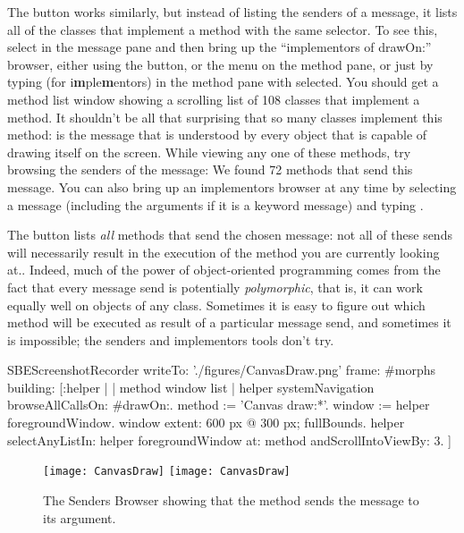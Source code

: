 \documentclass[a4paper,10pt,twoside]{book}
\begin{document}
The  button works similarly, but instead of listing the senders of a message, it lists all of the classes that implement a method with the same selector.
To see this, select  in the message pane and then bring up the ``implementors of drawOn:'' browser, either using the  button, or the  menu on the method pane, or just by typing  (for {i\textbf{m}ple\textbf{m}entors}) in the method pane with  selected.
You should get a method list window showing a scrolling list of 108 classes that implement a  method.
It shouldn't be all that surprising that so many classes implement this method:
 is the message that is understood by every object that is capable of drawing itself on the screen.
While viewing any one of these methods, try browsing the senders of the  message:
We found 72 methods that send this message.
You can also bring up an implementors browser at any time by selecting a message (including the arguments if it is a keyword message) and typing .

The  button lists \emph{all} methods that send the chosen message: not all of these sends will necessarily result in the execution of the method you are currently looking at..
Indeed, much of the power of object-oriented programming comes from the fact that every message send is potentially \emph{polymorphic}, that is, it can work equally well on objects of any class.  Sometimes it is easy to figure out which method will be executed as result of a particular message send, and sometimes it is impossible; the senders and implementors tools don't try.

\begin{ExecuteSmalltalkScript}
SBEScreenshotRecorder writeTo: './figures/CanvasDraw.png' frame: #morphs building: [:helper |
	| method window list |
	helper systemNavigation browseAllCallsOn: #drawOn:.
	method := 'Canvas draw:*'.
	window := helper foregroundWindow.
	window extent: 600 px @ 300 px; fullBounds.
	helper selectAnyListIn: helper foregroundWindow at: method andScrollIntoViewBy: 3.
]
\end{ExecuteSmalltalkScript}
\begin{figure}[htbp]
	\begin{center}
   \ifluluelse
		{\texttt{[image: CanvasDraw]}}
		{\texttt{[image: CanvasDraw]}}
	\end{center}
	\caption{The Senders Browser showing that the  method sends the  message to its argument.	\label{fig:CanvasDraw}}
\end{figure}
\end{document}
